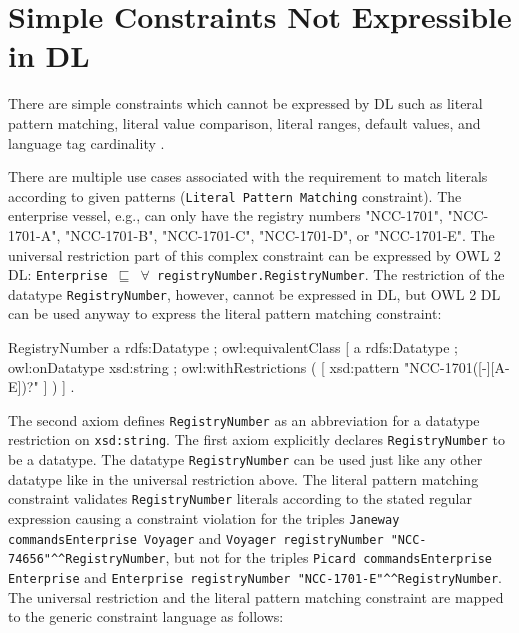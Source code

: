 \documentclass{llncs}
\newcommand{\ms}[1]{\texttt{#1}}
\begin{document}
\section{Simple Constraints Not Expressible in DL}

There are simple constraints which cannot be expressed by DL such as literal pattern matching, literal value comparison, literal ranges, default values, and language tag cardinality \cite{BoschNolleAcarEckert2015}.


There are multiple use cases associated with the requirement to match literals according to given patterns (\ms{Literal Pattern Matching} constraint).
The enterprise vessel, e.g.,  can only have the registry numbers "NCC-1701", "NCC-1701-A", "NCC-1701-B", "NCC-1701-C", "NCC-1701-D", or "NCC-1701-E".
The universal restriction part of this complex constraint can be expressed by OWL 2 DL:
\ms{Enterprise $\sqsubseteq$ $\forall$ registryNumber.RegistryNumber}.
The restriction of the datatype \ms{RegistryNumber}, however, cannot be expressed in DL, but OWL 2 DL can be used anyway to express the literal pattern matching constraint:

\begin{ex}
RegistryNumber
    a rdfs:Datatype ;
    owl:equivalentClass [
        a rdfs:Datatype ;
        owl:onDatatype xsd:string ;
        owl:withRestrictions ( 
            [ xsd:pattern "NCC-1701([-][A-E])?" ] ) ] .
\end{ex}

The second axiom defines \ms{RegistryNumber} as an abbreviation for a datatype restriction on \ms{xsd:string}. 
The first axiom explicitly declares \ms{RegistryNumber} to be a datatype. 
The datatype \ms{RegistryNumber} can be used just like any other datatype like in the universal restriction above.
The literal pattern matching constraint validates \ms{RegistryNumber} literals according to the stated regular expression causing a constraint violation for the triples 
\ms{Janeway commandsEnterprise Voyager} and \ms{Voyager registryNumber "NCC-74656"\textasciicircum{}\textasciicircum{}RegistryNumber}, 
but not for the triples \ms{Picard commandsEnterprise Enterprise} and \ms{Enterprise registryNumber "NCC-1701-E"\textasciicircum{}\textasciicircum{}RegistryNumber}.
The universal restriction and the literal pattern matching constraint are mapped to the generic constraint language as follows:
\end{document}
